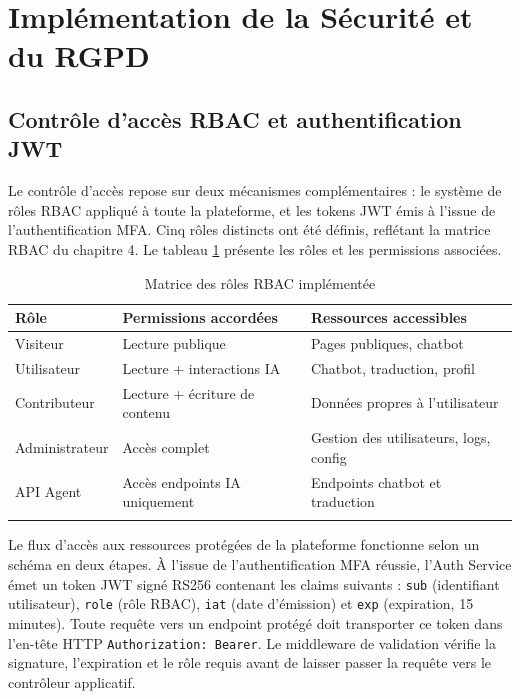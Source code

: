 \section{Implémentation de la Sécurité et du RGPD}

\subsection{Contrôle d'accès RBAC et authentification JWT}
Le contrôle d'accès repose sur deux mécanismes complémentaires : le système de rôles RBAC appliqué à toute la plateforme, et les tokens JWT émis à l'issue de l'authentification MFA. Cinq rôles distincts ont été définis, reflétant la matrice RBAC du chapitre 4. Le tableau \ref{tab:rbac_impl} présente les rôles et les permissions associées.

\begin{longtable}{|m{3cm}|m{4cm}|m{5.5cm}|}
\hline
\textbf{Rôle} & \textbf{Permissions accordées} & \textbf{Ressources accessibles} \\
\hline
\endhead
\endfoot
\endlastfoot
\hline
Visiteur & Lecture publique & Pages publiques, chatbot \\
\hline
Utilisateur & Lecture + interactions IA & Chatbot, traduction, profil \\
\hline
Contributeur & Lecture + écriture de contenu & Données propres à l'utilisateur \\
\hline
Administrateur & Accès complet & Gestion des utilisateurs, logs, config \\
\hline
API Agent & Accès endpoints IA uniquement & Endpoints chatbot et traduction \\
\hline
\captionsetup{justification=centering,margin=2cm}
\caption{Matrice des rôles RBAC implémentée}
\label{tab:rbac_impl}
\end{longtable}

Le flux d'accès aux ressources protégées de la plateforme fonctionne selon un schéma en deux étapes. À l'issue de l'authentification MFA réussie, l'Auth Service émet un token JWT signé RS256 contenant les claims suivants : \texttt{sub} (identifiant utilisateur), \texttt{role} (rôle RBAC), \texttt{iat} (date d'émission) et \texttt{exp} (expiration, 15 minutes). Toute requête vers un endpoint protégé doit transporter ce token dans l'en-tête HTTP \texttt{Authorization: Bearer}. Le middleware de validation vérifie la signature, l'expiration et le rôle requis avant de laisser passer la requête vers le contrôleur applicatif.

